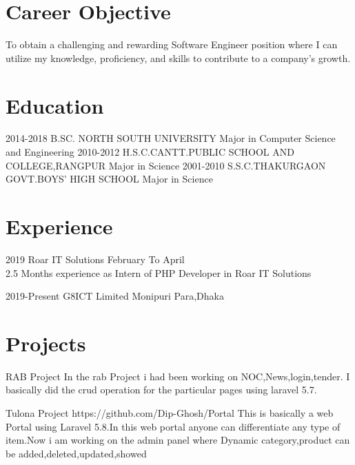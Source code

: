\documentclass[]{cv-style}
\begin{document}
\section{Career Objective}
To obtain a challenging and rewarding Software Engineer position where I can utilize my knowledge, proficiency, and skills to contribute to a company's growth.
\section{Education}
\begin{entrylist}
  \entry
    {2014-2018} 
    {B.SC. NORTH SOUTH UNIVERSITY}
    {Major in Computer Science and Engineering}
    {}
  \entry
    {2010-2012}
    {H.S.C.CANTT.PUBLIC SCHOOL AND COLLEGE,RANGPUR}
    {Major in Science}
        {}
  \entry
    {2001-2010}
    {S.S.C.THAKURGAON GOVT.BOYS' HIGH SCHOOL}
    {Major in Science}
     {}


\end{entrylist}
\section{Experience}
\begin{entrylist}
\entry
  {2019}
  {Roar IT Solutions}
  {February To April}
  {\\
  2.5 Months experience as Intern of PHP Developer in Roar IT Solutions}
  
\entry
  {2019-Present}
  {G8ICT Limited}
  {Monipuri Para,Dhaka}
  {}

\end{entrylist}
\section{Projects}
\begin{entrylist}
\entry
{}
{RAB Project}
{}
{ In the rab Project i had been working on NOC,News,login,tender. I basically did the crud operation for the particular pages using laravel 5.7.}
~
\end{entrylist}
\begin{entrylist}
\entry
{}
{Tulona Project }
{{https://github.com/Dip-Ghosh/Portal}}
{This is basically a web Portal using Laravel 5.8.In this web portal anyone can differentiate any type of item.Now i am working on the admin panel where Dynamic category,product can be added,deleted,updated,showed}

\end{entrylist}
\end{document}
